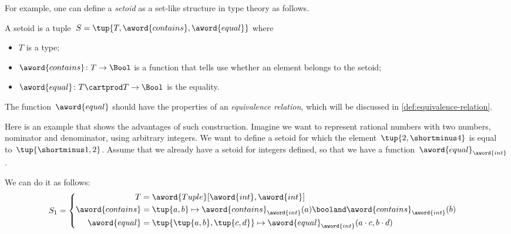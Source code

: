 For example, one can define a \emph{setoid} as a set-like structure in type theory as follows.

\begin{ctdefinition}[Setoid]
    A setoid is a tuple~$S = \tup{T, \aword{contains}, \aword{equal}}$ where
    \begin{itemize}
        \item $T$ is a type;
        \item $\aword{contains}\colon T\to\Bool$ is a function that tells use whether an element belongs to the setoid;
        \item $\aword{equal}\colon T\cartprod T\to\Bool$ is the equality.
    \end{itemize}
\end{ctdefinition}
The function~$\aword{equal}$ should have the properties of an \emph{equivalence relation},
which will be discussed in \cref{def:equivalence-relation}.

Here is an example that shows the advantages of such construction.
Imagine we want to represent rational numbers with two numbers, nominator and denominator, using arbitrary integers.
We want to define a setoid for which the element~$\tup{2, \shortminus 4}$ is equal to~$\tup{ \shortminus  1, 2}$.
Assume that we already have a setoid for integers defined, so that we have a function~$\aword{equal}_{\aword{int}}$.

We can do it as follows:
\begin{equation}
    S_1 =
    \begin{cases}
        \begin{aligned}
            T                & =
            \aword{Tuple}[\aword{int}, \aword{int}]
            \\
            \aword{contains} & = \tup{a,b} \mapsto \aword{contains}_{\aword{int}}(a)  \booland \aword{contains}_{\aword{int}}(b)
            \\
            \aword{equal}    & = \tup{\tup{a,b}, \tup{c,d}}
            \mapsto \aword{equal}_{\aword{int}} (a\cdot c, b\cdot d)
        \end{aligned}
    \end{cases}
\end{equation}


